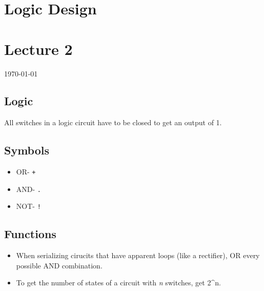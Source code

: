 \documentclass[12pt]{article}
\begin{document}
{\centering
\section*{Logic Design}
\section*{Lecture 2}
\indent\today
}

\subsection*{Logic}
All switches in a logic circuit have to be closed to get an output of 1.

\subsection*{Symbols}
\begin{itemize}
    \item OR- \texttt{+}
    \item AND- \texttt{.}
    \item NOT- \texttt{!}
\end{itemize}

\subsection*{Functions}
\begin{itemize}
    \item When serializing cirucits that have apparent loops (like a rectifier), OR every possible AND combination.
    \item To get the number of states of a circuit with \textit{n} switches, get 2^n.
\end{itemize}
\end{document}
